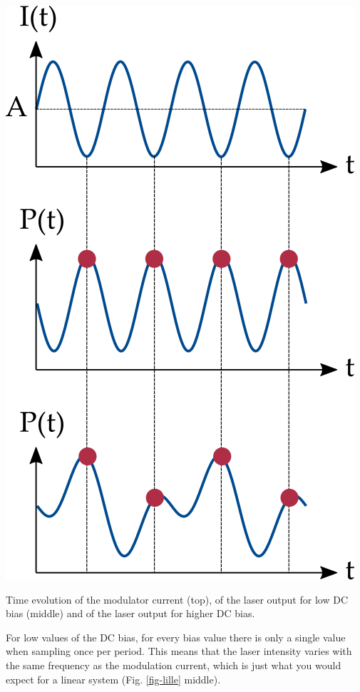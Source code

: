 \begin{marginfigure}
\centering
\includegraphics{dynamic/figures/lille}
\caption{Time evolution of the modulator current (top), of the laser output for low DC bias (middle) and of the laser output for higher DC bias.}
\label{fig-lille}
\end{marginfigure}

For low values of the DC bias, for every bias value there is only a single value when sampling once per period. This means that the laser intensity varies with the same frequency as the modulation current, which is just what you would expect for a linear system (Fig. \ref{fig-lille} middle).

